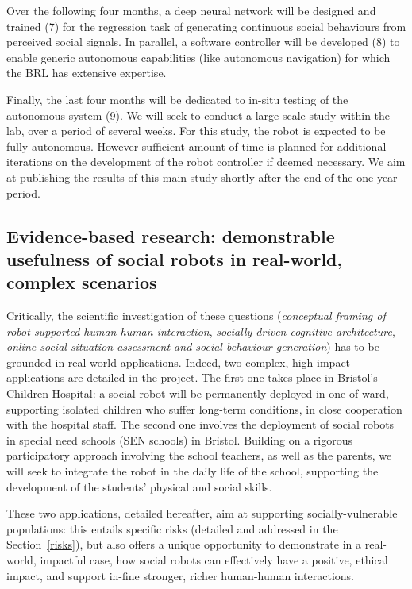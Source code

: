 \documentclass[11pt]{report}
\begin{document}
Over the following four months, a deep neural network will be designed
and trained (7) for the regression task of generating continuous social
behaviours from perceived social signals. In parallel, a software
controller will be developed (8) to enable generic autonomous
capabilities (like autonomous navigation) for which the BRL has
extensive expertise.

Finally, the last four months will be dedicated to in-situ testing of
the autonomous system (9). We will seek to conduct a large scale study
within the lab, over a period of several weeks. For this study, the
robot is expected to be fully autonomous. However sufficient amount of
time is planned for additional iterations on the development of the
robot controller if deemed necessary. We aim at publishing the results
of this main study shortly after the end of the one-year period.


\subsection{Evidence-based research: demonstrable usefulness of social robots in
real-world, complex scenarios}


Critically, the scientific investigation of these questions (\emph{conceptual
framing of robot-supported human-human interaction}, \emph{socially-driven
cognitive architecture},  \emph{online social situation assessment and social
behaviour generation}) has to be
grounded in real-world applications. Indeed, two complex, high impact
applications are detailed in the project. The first one takes place in
Bristol's Children Hospital: a social robot will be permanently deployed in one
of ward, supporting isolated children who suffer long-term conditions, in close
cooperation with the hospital staff. The second one involves the deployment of 
social robots in special need schools (SEN schools) in Bristol. Building on a
rigorous participatory approach involving the school teachers, as well as the
parents, we will seek to integrate the robot in the daily life of the school,
supporting the development of the students' physical and social skills.

These two applications, detailed hereafter, aim at supporting
socially-vulnerable populations: this entails specific risks (detailed and
addressed in the Section~\ref{risks}), but also offers a unique opportunity to
demonstrate in a real-world, impactful case, how social robots can effectively
have a positive, ethical impact, and support in-fine stronger, richer
human-human interactions.
\end{document}
